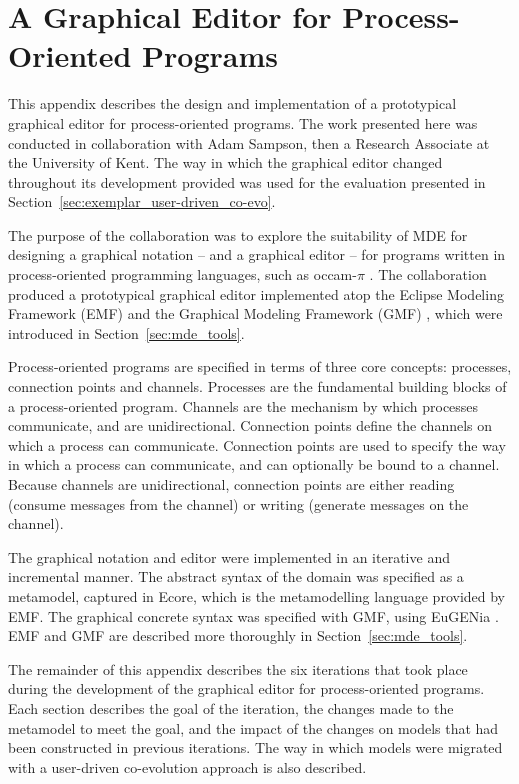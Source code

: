 
\chapter[A Graphical Editor for Process-Oriented Programs][An Exemplar Graphical Model Editor]{A Graphical Editor for Process-Oriented Programs}
\label{ProcessOriented}

This appendix describes the design and implementation of a prototypical graphical editor for process-oriented programs. The work presented here was conducted in collaboration with Adam Sampson, then a Research Associate at the University of Kent. The way in which the graphical editor changed throughout its development provided was used for the evaluation presented in Section~\ref{sec:exemplar_user-driven_co-evo}.

The purpose of the collaboration was to explore the suitability of MDE  for designing a graphical notation -- and a graphical editor -- for programs written in process-oriented programming languages, such as occam-$\pi$ \cite{occam_pi}. The collaboration produced a prototypical graphical editor implemented atop the Eclipse Modeling Framework (EMF) \cite{steinberg09emf} and the Graphical Modeling Framework (GMF) \cite{gronback09emp}, which were introduced in Section~\ref{sec:mde_tools}.

Process-oriented programs are specified in terms of three core concepts: processes, connection points and channels. Processes are the fundamental building blocks of a process-oriented program. Channels are the mechanism by which processes communicate, and are unidirectional. Connection points define the channels on which a process can communicate. Connection points are used to specify the way in which a process can communicate, and can optionally be bound to a channel. Because channels are unidirectional, connection points are either reading (consume messages from the channel) or writing (generate messages on the channel).

The graphical notation and editor were implemented in an iterative and incremental manner. The abstract syntax of the domain was specified as a metamodel, captured in Ecore, which is the metamodelling language provided by EMF. The graphical concrete syntax was specified with GMF, using EuGENia \cite{kolovos10eugenia}. EMF and GMF are described more thoroughly in Section~\ref{sec:mde_tools}.

The remainder of this appendix describes the six iterations that took place during the development of the graphical editor for process-oriented programs. Each section describes the goal of the iteration, the changes made to the metamodel to meet the goal, and the impact of the changes on models that had been constructed in previous iterations. The way in which models were migrated with a user-driven co-evolution approach is also described.

